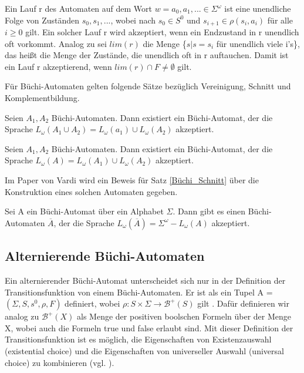 Ein Lauf r des Automaten auf dem Wort $w=a_0,a_1,... \in \Sigma^{\omega}$ ist eine unendliche Folge von Zuständen $s_0,s_1,...$, wobei nach \cite{vardi+96} $s_0 \in S^0$ und $s_{i+1} \in \rho(s_i, a_i)$ für alle $i \geq 0$ gilt. Ein solcher Lauf r wird akzeptiert, wenn ein Endzustand in r unendlich oft vorkommt. Analog zu \cite{vardi+96} sei $lim(r)$ die Menge \{$s|s=s_i$ für unendlich viele i's\}, das heißt die Menge der Zustände, die unendlich oft in r auftauchen. Damit ist ein Lauf r akzeptierend, wenn $lim(r)\cap F \neq \emptyset$ gilt.

Für Büchi-Automaten gelten folgende Sätze bezüglich Vereinigung, Schnitt und Komplementbildung. 

\begin{satz}\cite{choueka74, vardi+96}
\label{Büchi_Vereinigung}
Seien $A_1, A_2$ Büchi-Automaten. Dann existiert ein Büchi-Automat, der die Sprache $L_{\omega}(A_1\cup A_2)=L_{\omega}(a_1)\cup L_{\omega}(A_2)$ akzeptiert.
\end{satz}
\begin{satz}\cite{choueka74,vardi+96}
\label{Büchi_Schnitt}
Seien $A_1, A_2$ Büchi-Automaten. Dann existiert ein Büchi-Automat, der die Sprache $L_{\omega}(A)=L_{\omega}(A_1)\cup L_{\omega}(A_2)$ akzeptiert.
\end{satz}
Im Paper von Vardi \cite{vardi+96} wird ein Beweis für Satz \ref{Büchi_Schnitt} über die Konstruktion eines solchen Automaten gegeben.
\begin{satz}\cite{buechi62,vardi+96}
\label{Büchi_Komplement}
Sei A ein Büchi-Automat über ein Alphabet $\Sigma$. Dann gibt es einen Büchi-Automaten $\overline{A}$, der die Sprache $L_\omega(\overline{A})=\Sigma^\omega - L_\omega(A)$ akzeptiert.
\end{satz}

\subsection{Alternierende Büchi-Automaten}

Ein alternierender Büchi-Automat unterscheidet sich nur in der Definition der Transitionsfunktion von einem Büchi-Automaten. Er ist als ein Tupel A = $(\Sigma,S,s^0,\rho,F)$ definiert, wobei $\rho : S \times \Sigma \rightarrow \mathcal{B}^+(S)$ gilt \cite{vardi+96}. Dafür definieren wir analog zu \cite{vardi+96} $\mathcal{B}^+(X)$ als Menge der positiven boolschen Formeln über der Menge X, wobei auch die Formeln true und false erlaubt sind.  Mit dieser Definition der Transitionsfunktion ist es möglich, die Eigenschaften von Existenzauswahl (existential choice) und die Eigenschaften von universeller Auswahl (universal choice) zu kombinieren (vgl. \cite{vardi+96}).

